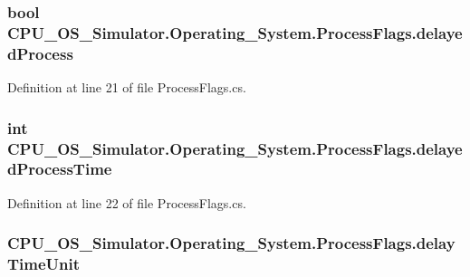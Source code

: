 \subsubsection[{delayed\+Process}]{\setlength{\rightskip}{0pt plus 5cm}bool C\+P\+U\+\_\+\+O\+S\+\_\+\+Simulator.\+Operating\+\_\+\+System.\+Process\+Flags.\+delayed\+Process}\label{struct_c_p_u___o_s___simulator_1_1_operating___system_1_1_process_flags_ac6a4a5a7465da7e567a655cae4dd1aa4}


Definition at line 21 of file Process\+Flags.\+cs.

\hypertarget{struct_c_p_u___o_s___simulator_1_1_operating___system_1_1_process_flags_a9b9ff1ea252f64035813f0f478d705ae}{}
\subsubsection[{delayed\+Process\+Time}]{\setlength{\rightskip}{0pt plus 5cm}int C\+P\+U\+\_\+\+O\+S\+\_\+\+Simulator.\+Operating\+\_\+\+System.\+Process\+Flags.\+delayed\+Process\+Time}\label{struct_c_p_u___o_s___simulator_1_1_operating___system_1_1_process_flags_a9b9ff1ea252f64035813f0f478d705ae}


Definition at line 22 of file Process\+Flags.\+cs.

\hypertarget{struct_c_p_u___o_s___simulator_1_1_operating___system_1_1_process_flags_a0e5e535ff000e1b630180443c2295776}{}
\subsubsection[{delay\+Time\+Unit}]{ C\+P\+U\+\_\+\+O\+S\+\_\+\+Simulator.\+Operating\+\_\+\+System.\+Process\+Flags.\+delay\+Time\+Unit}\label{struct_c_p_u___o_s___simulator_1_1_operating___system_1_1_process_flags_a0e5e535ff000e1b630180443c2295776}



